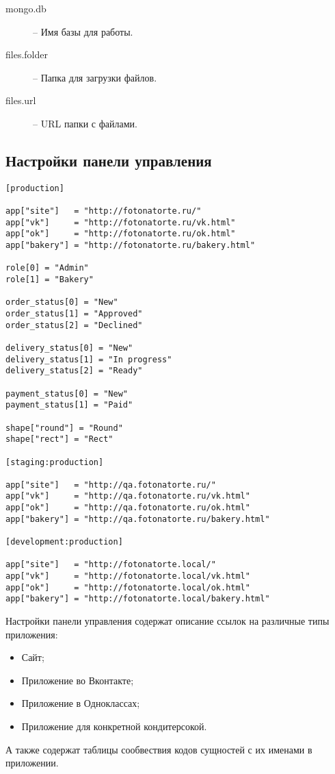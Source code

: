 \documentclass[a4paper,12pt]{report}
\begin{document}
			\begin{description}
				\item[mongo.db] -- Имя базы для работы.		
				\item[files.folder] -- Папка для загрузки файлов.
				\item[files.url] -- URL папки с файлами.
			\end{description}
		
			\subsection*{Настройки панели управления}

		
			\tt{\begin{lstlisting}[caption={Настройки панели управления}]
[production]

app["site"]   = "http://fotonatorte.ru/"
app["vk"]     = "http://fotonatorte.ru/vk.html"
app["ok"]     = "http://fotonatorte.ru/ok.html"
app["bakery"] = "http://fotonatorte.ru/bakery.html"

role[0] = "Admin"
role[1] = "Bakery"

order_status[0] = "New"
order_status[1] = "Approved"
order_status[2] = "Declined"

delivery_status[0] = "New"
delivery_status[1] = "In progress"
delivery_status[2] = "Ready"

payment_status[0] = "New"
payment_status[1] = "Paid"

shape["round"] = "Round"
shape["rect"] = "Rect"

[staging:production]

app["site"]   = "http://qa.fotonatorte.ru/"
app["vk"]     = "http://qa.fotonatorte.ru/vk.html"
app["ok"]     = "http://qa.fotonatorte.ru/ok.html"
app["bakery"] = "http://qa.fotonatorte.ru/bakery.html"

[development:production]

app["site"]   = "http://fotonatorte.local/"
app["vk"]     = "http://fotonatorte.local/vk.html"
app["ok"]     = "http://fotonatorte.local/ok.html"
app["bakery"] = "http://fotonatorte.local/bakery.html"
			\end{lstlisting}}		
		
			Настройки панели управления содержат описание ссылок на различные типы приложения:
			
			\begin{itemize}
				\item Сайт;	
				\item Приложение во Вконтакте;				
				\item Приложение в Одноклассах;		
				\item Приложение для конкретной кондитерсокой.
			\end{itemize}
			
			А также содержат таблицы сообвествия кодов сущностей с их именами в приложении.
			
\end{document}
